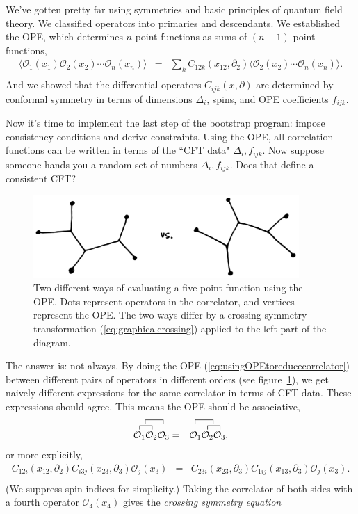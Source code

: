 \documentclass{ws-rv9x6}
\newcommand\be{\begin{eqnarray}}
\newcommand\ee{\end{eqnarray}}
\newcommand\cO{\mathcal{O}}
\newcommand\ptl\partial
\newcommand\<\langle
\renewcommand\>\rangle
\newcommand\nn{\nonumber}
\renewcommand\.{\cdot}
\newcommand\De{\Delta}
\begin{document}
We've gotten pretty far using symmetries and basic principles of quantum field theory.  We  classified operators into primaries and descendants. We established the OPE, which determines $n$-point functions as sums of $(n-1)$-point functions,
\be
\label{eq:usingOPEtoreducecorrelator}
\<\cO_1(x_1)\cO_2(x_2)\cdots\cO_n(x_n)\> &=& \sum_k C_{12k}(x_{12},\ptl_2)\<\cO_2(x_2)\cdots\cO_n(x_n)\>.\nn\\
\ee
And we showed that the differential operators $C_{ijk}(x,\ptl)$ are determined by conformal symmetry in terms of dimensions $\De_i$, spins, and OPE coefficients $f_{ijk}$. 

Now it's time to implement the last step of the bootstrap program: impose consistency conditions and derive constraints.  Using the OPE, all correlation functions can be written in terms of the ``CFT data" $\De_i,f_{ijk}$.  Now suppose someone hands you a random set of numbers $\De_i,f_{ijk}$.  Does that define a consistent CFT?

\begin{figure}
\begin{center}
\includegraphics[width=0.9\textwidth]{opedifferentways.jpg}
\end{center}
\caption{Two different ways of evaluating a five-point function using the OPE\@.  Dots represent operators in the correlator, and vertices represent the OPE\@. The two ways differ by a crossing symmetry transformation (\ref{eq:graphicalcrossing}) applied to the left part of the diagram.\label{fig:opedifferentways}}
\end{figure}

The answer is: not always.  By doing the OPE (\ref{eq:usingOPEtoreducecorrelator}) between different pairs of operators in different orders (see figure~\ref{fig:opedifferentways}), we get naively different expressions for the same correlator in terms of CFT data.  These expressions should agree. 
This means the OPE should be associative,
\be
\contraction{}{
\frac 1 2\!\!\!\!\!
\cO_1\cO_2
}{}{\cO_3}
\contraction{}{\cO_1}{}{\cO_2}
\cO_1\cO_2\cO_3
&=&
\contraction{}{
\frac 1 2\!\!\!\!\!
\cO_1
}{}{
\contraction{}{\cO_2}{}{\cO_3}
\cO_2\cO_3
}
\contraction{\cO_1}{\cO_2}{}{\cO_3}
\cO_1\cO_2\cO_3,
\ee
or more explicitly,
\be
\label{eq:OPEassociativity}
C_{12i}(x_{12},\ptl_2)C_{i3j}(x_{23},\ptl_3)\cO_j(x_3) &=& C_{23i}(x_{23},\ptl_3)C_{1ij}(x_{13},\ptl_3)\cO_j(x_3).\nn\\
\ee
(We suppress spin indices for simplicity.)
Taking the correlator of both sides with a fourth operator $\cO_4(x_4)$ gives the {\it crossing symmetry equation}
\end{document}
